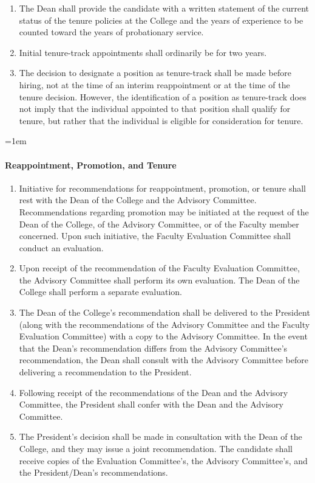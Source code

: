\documentclass{manual}
\let\oldparagraph\paragraph
\renewcommand\paragraph{\leftskip=1em\oldparagraph}
\newcommand{\itemLevelA}{\alph*.}
\newcommand{\itemRefA}{\alph*}
\begin{document}
\begin{enumerate}[label=\itemLevelA,ref=\itemRefA]
\item The Dean shall provide the candidate with a written statement of the current status of the tenure policies at the College and the years of experience to be counted toward the years of probationary service.


\item Initial tenure-track appointments shall ordinarily be for two years.

\item The decision to designate a position as tenure-track shall be made before hiring, not at the time of an interim reappointment or at the time of the tenure decision. However, the identification of a position as tenure-track does not imply that the individual appointed to that position shall qualify for tenure, but rather that the individual is eligible for consideration for tenure.
\end{enumerate}


\paragraph{Reappointment, Promotion, and Tenure}
\begin{enumerate}[label=\itemLevelA,ref=\itemRefA]


\item Initiative for recommendations for reappointment, promotion, or tenure shall rest with the Dean of the College and the Advisory Committee. Recommendations regarding promotion may be initiated at the request of the Dean of the College, of the Advisory Committee, or of the Faculty member concerned. Upon such initiative, the Faculty Evaluation Committee shall conduct an evaluation.


\item Upon receipt of the recommendation of the Faculty Evaluation Committee, the Advisory Committee shall perform its own evaluation. The Dean of the College shall perform a separate evaluation.


\item The Dean of the College's recommendation shall be delivered to the President (along with the recommendations of the Advisory Committee and the Faculty Evaluation Committee) with a copy to the Advisory Committee. In the event that the Dean's recommendation differs from the Advisory Committee's recommendation, the Dean shall consult with the Advisory Committee before delivering a recommendation to the President.


\item Following receipt of the recommendations of the Dean and the Advisory Committee, the President shall confer with the Dean and the Advisory Committee.


\item The President's decision shall be made in consultation with the Dean of the College, and they may issue a joint recommendation. The candidate shall receive copies of the Evaluation Committee's, the Advisory Committee's, and the President/Dean's recommendations.
\end{enumerate}
\end{document}
